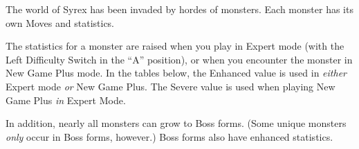 \documentclass[10pt,twocolumn]{memoir}
\begin{document}
The world of Syrex has been  invaded by hordes of monsters. Each monster
has its own Moves and statistics.

The statistics  for a monster  are raised when  you play in  Expert mode
(with the  Left Difficulty Switch  in the  ``A'' position), or  when you
encounter the  monster in New Game  Plus mode. In the  tables below, the
Enhanced value is  used in \emph{either} Expert mode  \emph{or} New Game
Plus. The  Severe value  is used  when playing  New Game  Plus \emph{in}
Expert Mode.



In addition,  nearly all monsters can  grow to Boss forms.  (Some unique
monsters \emph{only} occur in Boss forms, however.) Boss forms also have
enhanced statistics.

\newcommand\twicely[1]{\the\numexpr#1*2\relax}
\newcommand\thricely[1]{\the\numexpr#1*3\relax}
\newcommand\fourxly[1]{\the\numexpr#1*4\relax}
\newcommand\eightxly[1]{\the\numexpr#1*8\relax}

\newcommand\bytewise[1]{\ifnum #1 > 255
  {255}
  \else
  #1
  \fi}

\newcommand\twice[1]{\bytewise{\twicely{#1}}}
\newcommand\thrice[1]{\bytewise{\thricely{#1}}}
\newcommand\fourx[1]{\bytewise{\fourxly{#1}}}
\newcommand\eightx[1]{\bytewise{\eightxly{#1}}}
\end{document}
